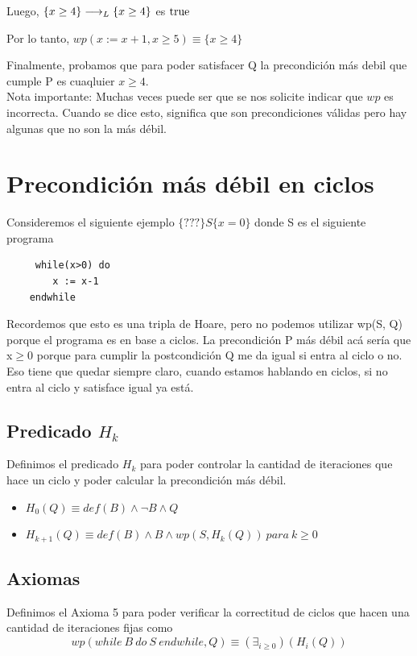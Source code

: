\documentclass[10pt,a4paper]{article}
\begin{document}
Luego, \(\{x \ge 4\} \longrightarrow _L \{x \ge 4\}\) es \(\mathrm{true}\)

Por lo tanto, \(wp(x:=x+1, x \ge 5) \equiv \{x \ge 4\}\)

Finalmente, probamos que para poder satisfacer Q la precondición más debil que cumple P es cuaqluier \(x \ge 4\). \\

Nota importante: Muchas veces puede ser que se nos solicite indicar que \(wp\) es incorrecta. Cuando se dice esto, significa que son precondiciones válidas pero hay algunas que no son la más débil.

\newpage 
\section*{Precondición más débil en ciclos}
Consideremos el siguiente ejemplo
\(\{???\} S \{x=0\}\)
donde S es el siguiente programa 

\begin{lstlisting}
     while(x>0) do
        x := x-1
    endwhile
 \end{lstlisting}

 Recordemos que esto es una tripla de Hoare, pero no podemos utilizar wp(S, Q) porque el programa es en base a ciclos. La precondición P más débil acá sería que x\(\ge\)0 porque para cumplir la postcondición Q me da igual si entra al ciclo o no.
 Eso tiene que quedar siempre claro, cuando estamos hablando en ciclos, si no entra al ciclo y satisface igual ya está.
 \subsection*{Predicado \(H_{k}\)}
 Definimos el predicado \(H_{k}\) para poder controlar la cantidad de iteraciones que hace un ciclo y poder calcular la precondición más débil.
 \begin{itemize}
    \item \(H_{0}(Q) \equiv def(B) \land \neg B \land Q\)
    \item \(H_{k+1}(Q) \equiv def(B) \land B \land wp(S, H_{k}(Q)) \ para \ k \ge 0\) 
\end{itemize} 
\subsection*{Axiomas}
Definimos el Axioma 5 para poder verificar la correctitud de ciclos que hacen una cantidad de iteraciones fijas como \\
\[wp(while \ B \ do \ S \ endwhile, Q) \equiv (\exists_{i\ge0})(H_{i}(Q))\]
\end{document}
